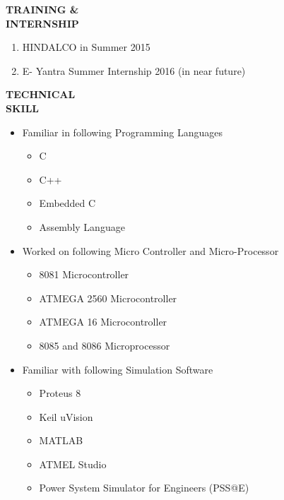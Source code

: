 \documentclass{article}
\begin{document}
\begin{flushleft} 
	\vspace{0.3in}
	\textbf{TRAINING \& \\ INTERNSHIP}
	\begin{enumerate}
		\vspace{-0.44in}
		\addtolength{\itemindent}{1.359in}
		\item  HINDALCO in Summer 2015
		\item  E- Yantra Summer Internship 2016 (in near future)
	\end{enumerate}
\end{flushleft}

 
 \begin{flushleft}
 	\vspace{0.4in}
 	\textbf{TECHNICAL  \\ SKILL}
 	\begin{itemize}
 		\vspace{-0.45in}
 		\addtolength{\itemindent}{1.359in}
 		\item  Familiar in following Programming Languages
 		{\begin{itemize}
 				\addtolength{\itemindent}{1.359in}
 				\item C
 				\item C++
 				\item Embedded C
 				\item Assembly Language
 				
 			\end{itemize}
 		}  
 		\item Worked on following  Micro Controller and Micro-Processor
 		{\begin{itemize}
 				\addtolength{\itemindent}{1.359in}
 				\item 8081 Microcontroller
 				\item ATMEGA 2560 Microcontroller
 				\item ATMEGA 16 Microcontroller
 				\item 8085 and 8086 Microprocessor
 				
 			\end{itemize}
 		} 
 		\item  Familiar with following Simulation Software
 		{\begin{itemize}
 				\addtolength{\itemindent}{1.359in}
 				\item Proteus 8
 				\item Keil uVision
 				\item MATLAB  	
 				\item ATMEL Studio
 				\item Power System Simulator for Engineers (PSS@E)		
 			\end{itemize}
 		} 
 		
 	\end{itemize}
 \end{flushleft}
 
\end{document}
